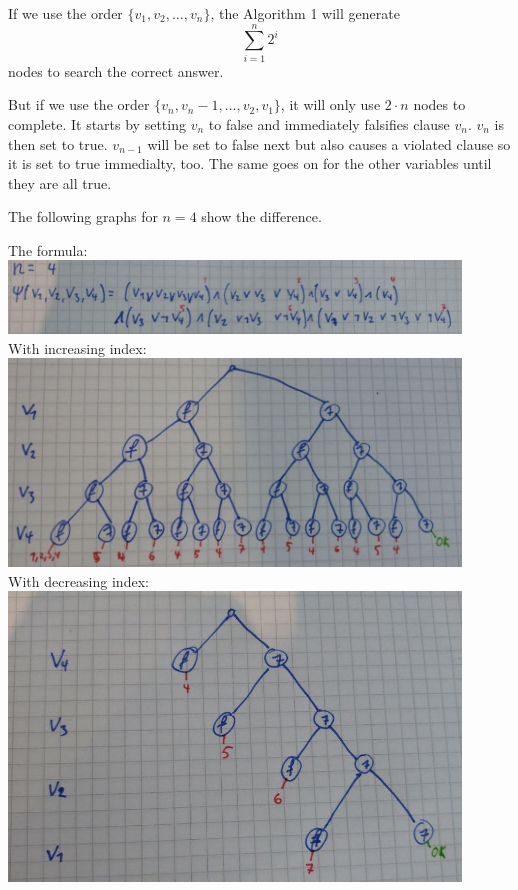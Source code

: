 \documentclass{../base/base}
\begin{document}
If we use the order $\{v_1,v_2,\dots,v_n\}$, the Algorithm 1 will generate $$\sum_{i=1}^{n} 2^{i} $$ nodes to search the correct answer. 

But if we use the order $\{v_n, v_n-1,\dots,v_2, v_1\}$, it will only use $2\cdot n$ nodes to complete. 
It starts by setting $v_n$ to false and immediately falsifies clause $v_n$. $v_n$ is then set to true.
$v_{n-1}$ will be set to false next but also causes a violated clause so it is set to true immedialty, too.
The same goes on for the other variables until they are all true.

The following graphs for $n=4$ show the difference.
\clearpage
\begin{centering}
    The formula:
\includegraphics[width=0.9\textwidth]{def.jpg} \\
With increasing index:
\includegraphics[width=0.9\textwidth]{forward.jpg} \\
With decreasing index:
\includegraphics[width=0.9\textwidth]{backward.jpg} \\
\end{centering}
\end{document}
